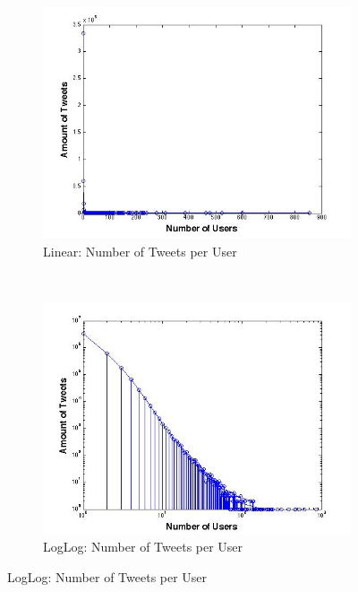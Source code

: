 \begin{figure}[ht]
        \centering
        \begin{subfigure}[b]{0.5\textwidth}
                \includegraphics[width=\textwidth]{img/anal/linear_user}
                \caption{Linear: Number of Tweets per User}
                \label{fig:u_linear}
        \end{subfigure}%
        ~ %
        \begin{subfigure}[b]{0.5\textwidth}
                \includegraphics[width=\textwidth]{img/anal/loglog_users_tweets}
                \caption{LogLog: Number of Tweets per User}

\end{subfigure}
\end{figure}
